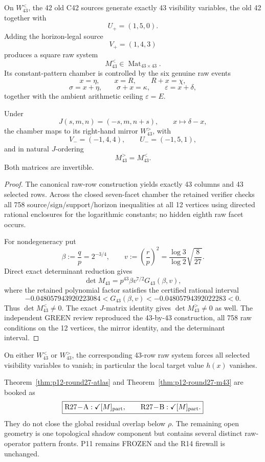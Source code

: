\begin{theorem}
\label{thm:p12-round27-m43}
On \(W_{43}^{<}\), the 42 old C42 sources generate exactly 43 visibility
variables, the old 42 together with
\[
U_+=(1,5,0).
\]
Adding the horizon-legal source
\[
V_+=(1,4,3)
\]
produces a square raw system
\[
M_{43}^{<}\in\operatorname{Mat}_{43\times43}.
\]
Its constant-pattern chamber is controlled by the six genuine raw events
\[
x=\eta,
\qquad
x=R,
\qquad
R+x=\chi,
\]
\[
\sigma=x+\eta,
\qquad
\sigma+x=\kappa,
\qquad
\varepsilon=x+\delta,
\]
together with the ambient arithmetic ceiling \(\varepsilon=E\).

Under
\[
J(s,m,n)=(-s,m,n+s),
\qquad
x\mapsto\delta-x,
\]
the chamber maps to its right-hand mirror \(W_{43}^{>}\), with
\[
V_-=(-1,4,4),
\qquad
U_-=(-1,5,1),
\]
and in natural \(J\)-ordering
\[
M_{43}^{>}=M_{43}^{<}.
\]
Both matrices are invertible.
\end{theorem}

\begin{proof}
The canonical raw-row construction yields exactly 43 columns and 43 selected
rows. Across the closed seven-facet chamber the retained verifier checks all
758 source/sign/support/horizon inequalities at all 12 vertices using
directed rational enclosures for the logarithmic constants; no hidden eighth
raw facet occurs.

For nondegeneracy put
\[
\beta:=\frac qp=2^{-3/4},
\qquad
v:=\left(\frac rp\right)^2
=\frac{\log3}{\log2}\sqrt{\frac8{27}}.
\]
Direct exact determinant reduction gives
\[
\det M_{43}
=p^{43}\beta v^{7/2}G_{43}(\beta,v),
\]
where the retained polynomial factor satisfies the certified rational
interval
\[
-0.048057943920223084
< G_{43}(\beta,v)
< -0.04805794392022283
<0.
\]
Thus \(\det M_{43}^{<}\ne0\). The exact \(J\)-matrix identity gives
\(\det M_{43}^{>}\ne0\) as well. The independent GREEN review reproduced the
43-by-43 construction, all 758 raw conditions on the 12 vertices, the mirror
identity, and the determinant interval.
\end{proof}

\begin{corollary}
\label{cor:p12-round27-local}
On either \(W_{43}^{<}\) or \(W_{43}^{>}\), the corresponding 43-row raw
system forces all selected visibility variables to vanish; in particular the
local target value \(h(x)\) vanishes.
\end{corollary}

\begin{remark}
Theorem~\ref{thm:p12-round27-atlas} and
Theorem~\ref{thm:p12-round27-m43} are booked as
\[
\boxed{\mathrm{R27\!-\!A}:\checkmark[M]_{\rm part},
\qquad
\mathrm{R27\!-\!B}:\checkmark[M]_{\rm part}.}
\]
They do not close the global residual overlap below \(\rho\). The remaining
open geometry is one topological shadow component but contains several
distinct raw-operator pattern fronts. P11 remains FROZEN and the R14 firewall
is unchanged.
\end{remark}
